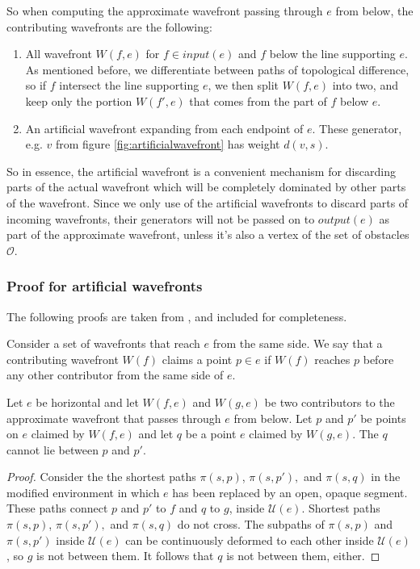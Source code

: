 So when computing the approximate wavefront passing through $e$ from below, the contributing 
wavefronts are the following:

\begin{enumerate}
\item All wavefront $W(f,e)$ for $f \in input(e)$ and $f$ below the line supporting $e$. As 
mentioned before, we differentiate between paths of topological difference, so if $f$ 
intersect the line supporting $e$, we then split $W(f,e)$ into two, and keep only the portion 
$W(f',e)$ that comes from the part of $f$ below $e$.
\item An artificial wavefront expanding from each endpoint of $e$. These generator, e.g. $v$ 
from figure \ref{fig:artificialwavefront} has weight $d(v,s)$.
\end{enumerate}

So in essence, the artificial wavefront is a convenient mechanism for discarding parts of the 
actual wavefront which will be completely dominated by other parts of the wavefront. Since we 
only use of the artificial wavefronts to discard parts of incoming wavefronts, their generators 
will not be passed on to $output(e)$ as part of the approximate wavefront, unless it's also a 
vertex of the set of obstacles $\mathcal{O}$.

\subsubsection{Proof for artificial wavefronts}

The following proofs are taken from \cite{HershbergerS99}, and included for completeness.

Consider a set of wavefronts that reach $e$ from the same side. We say that a
contributing wavefront $W(f)$  claims a point $p \in e$ if $W(f)$ reaches $p$
before any other contributor from the same side of $e$.

\begin{Lemma} 
	Let $e$ be horizontal  and let $W(f,e)$ and $W(g,e)$ be two contributors to the
	approximate wavefront that passes through $e$ from below. Let $p$ and $p'$ be
	points on $e$ claimed by $W(f,e)$ and let $q$ be a point $e$ claimed by $W(g,e)$. The
	$q$ cannot lie between $p$ and $p'$.
\end{Lemma}

\begin{proof}
	Consider the the shortest paths $\pi(s,p)$, $\pi(s,p'),$ and $\pi(s,q)$ in
	the modified environment in which $e$ has been replaced by an open, opaque
	segment. These paths connect $p$ and $p'$ to $f$ and $q$ to $g$, inside
	$\mathcal{U}(e)$. Shortest paths $\pi(s,p)$, $\pi(s,p'),$ and $\pi(s,q)$ do
	not cross. The subpaths of $\pi(s,p)$ and $\pi(s,p')$ inside
	$\mathcal{U}(e)$ can be continuously deformed to each other inside
	$\mathcal{U}(e)$, so $g$ is not between them. It follows that $q$ is not
	between them, either.
\end{proof}

